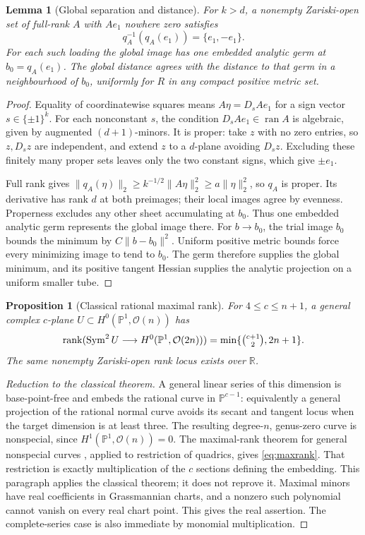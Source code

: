 \documentclass[11pt,reqno]{amsart}
\numberwithin{equation}{section}
\newtheorem{lemma}[theorem]{Lemma}
\newtheorem{proposition}[theorem]{Proposition}
\theoremstyle{definition}\newtheorem{definition}[theorem]{Definition}
\theoremstyle{remark}\newtheorem{remark}[theorem]{Remark}
\newcommand{\R}{\mathbb R}
\newcommand{\Pj}{\mathbb P}
\newcommand{\Sym}{\operatorname{Sym}}
\newcommand{\rank}{\operatorname{rank}}
\newcommand{\ran}{\operatorname{ran}}
\begin{document}
\begin{lemma}[Global separation and distance]\label{lem:global}
For $k>d$, a nonempty Zariski-open set of full-rank $A$ with $Ae_1$ nowhere zero satisfies
\[
 q_A^{-1}(q_A(e_1))=\{e_1,-e_1\}.
\]
For each such loading the global image has one embedded analytic germ at $b_0=q_A(e_1)$. The global distance agrees with the distance to that germ in a neighbourhood of $b_0$, uniformly for $R$ in any compact positive metric set.
\end{lemma}
\begin{proof}
Equality of coordinatewise squares means $A\eta=D_sAe_1$ for a sign vector $s\in\{\pm1\}^k$. For each nonconstant $s$, the condition $D_sAe_1\in\ran A$ is algebraic, given by augmented $(d+1)$-minors. It is proper: take $z$ with no zero entries, so $z,D_sz$ are independent, and extend $z$ to a $d$-plane avoiding $D_sz$. Excluding these finitely many proper sets leaves only the two constant signs, which give $\pm e_1$.

Full rank gives $\|q_A(\eta)\|_2\ge k^{-1/2}\|A\eta\|_2^2\ge a\|\eta\|_2^2$, so $q_A$ is proper. Its derivative has rank $d$ at both preimages; their local images agree by evenness. Properness excludes any other sheet accumulating at $b_0$. Thus one embedded analytic germ represents the global image there. For $b\to b_0$, the trial image $b_0$ bounds the minimum by $C\|b-b_0\|^2$. Uniform positive metric bounds force every minimizing image to tend to $b_0$. The germ therefore supplies the global minimum, and its positive tangent Hessian supplies the analytic projection on a uniform smaller tube.
\end{proof}

\begin{proposition}[Classical rational maximal rank]\label{prop:maxrank}
For $4\le c\le n+1$, a general complex $c$-plane $U\subset H^0(\Pj^1,\mathcal O(n))$ has
\begin{equation}\label{eq:maxrank}
 \rank(\Sym^2U\longrightarrow H^0(\Pj^1,\mathcal O(2n)))
 =\min\{\tbinom{c+1}{2},2n+1\}.
\end{equation}
The same nonempty Zariski-open rank locus exists over $\R$.
\end{proposition}
\begin{proof}[Reduction to the classical theorem]
A general linear series of this dimension is base-point-free and embeds the rational curve in $\Pj^{c-1}$: equivalently a general projection of the rational normal curve avoids its secant and tangent locus when the target dimension is at least three. The resulting degree-$n$, genus-zero curve is nonspecial, since $H^1(\Pj^1,\mathcal O(n))=0$. The maximal-rank theorem for general nonspecial curves \cite{BE85,BE87}, applied to restriction of quadrics, gives \eqref{eq:maxrank}. That restriction is exactly multiplication of the $c$ sections defining the embedding. This paragraph applies the classical theorem; it does not reprove it. Maximal minors have real coefficients in Grassmannian charts, and a nonzero such polynomial cannot vanish on every real chart point. This gives the real assertion. The complete-series case is also immediate by monomial multiplication.
\end{proof}
\end{document}
